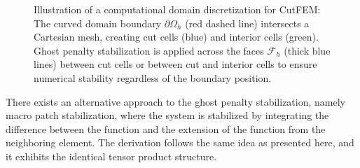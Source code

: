 \documentclass[11pt,a4paper]{article}
\begin{document}
\begin{figure}[!ht]
    \centering
    \caption{Illustration of a computational domain discretization for CutFEM: The curved domain boundary
        $\partial\Omega_h$ (red dashed line) intersects a Cartesian mesh, creating cut cells (blue) and interior cells
        (green).
        Ghost penalty stabilization is applied across the faces $\mathcal{F}_h$ (thick blue lines) between cut cells or
        between
        cut and interior cells to ensure numerical stability regardless of the boundary position.}
    \label{fig:intersected_cells}
\end{figure}

There exists an alternative approach to the ghost penalty stabilization, namely macro patch stabilization, where the
system is stabilized by integrating the difference between the function and the extension of the function from the
neighboring element. The derivation follows the same idea as presented here, and it exhibits the identical tensor
product structure.
\end{document}
